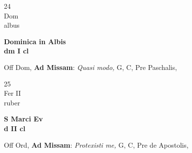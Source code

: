 \documentclass[10pt, openany]{book}
\begin{document}
        \begin{center}
            \begin{minipage}{3.5in}
                \vspace{2em}
                \begin{minipage}{0.5in}
                    {\Huge 24} \\
                    {\normalsize Dom} \\
                    {\normalsize albus}
                \end{minipage}
                \begin{minipage}{3.0in}
                    \textbf{ \large Dominica in Albis \\
                    \textnormal{\normalsize dm I cl}} \\ 
                \end{minipage}
                \begin{justify}Off Dom, \textbf{Ad Missam}: \textit{Quasi modo,} G, C, Pre Paschalis,  
                \end{justify}
            \end{minipage}
        \end{center}
    
        \begin{center}
            \begin{minipage}{3.5in}
                \vspace{2em}
                \begin{minipage}{0.5in}
                    {\Huge 25} \\
                    {\normalsize Fer II} \\
                    {\normalsize ruber}
                \end{minipage}
                \begin{minipage}{3.0in}
                    \textbf{ \large S Marci Ev \\
                    \textnormal{\normalsize d II cl}} \\ 
                \end{minipage}
                \begin{justify}Off Ord, \textbf{Ad Missam}: \textit{Protexisti me,} G, C, Pre de Apostolis,  
                \end{justify}
            \end{minipage}
        \end{center}
    
\end{document}
